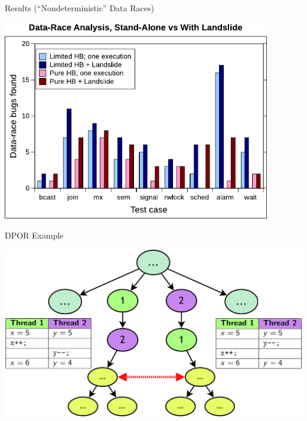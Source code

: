 \documentclass[xcolor=dvipsnames]{beamer}
\begin{document}
\begin{frame}{Results (``Nondeterministic'' Data Races)}
	\begin{center}
		\vspace{-0.8em}
	\includegraphics[width=0.88\textwidth]{dr-false-negatives-poster.pdf}
	\end{center}
\end{frame}

\begin{frame}{DPOR Example}
	\begin{center}
		\includegraphics[width=\textwidth]{undiamond1.png}
	\end{center}
\end{frame}
\end{document}

